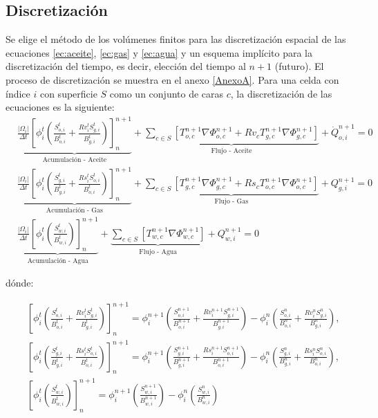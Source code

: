 \subsection{Discretización}

Se elige el método de los volúmenes finitos para las discretización espacial de las ecuaciones \ref{ec:aceite}, \ref{ec:gas} y \ref{ec:agua} y un esquema implícito para la discretización del tiempo, es decir, elección del tiempo al $n+1$ (futuro). El proceso de discretización se muestra en el anexo \ref{AnexoA}. Para una celda con índice $i$ con superficie $S$ como un conjunto de caras $c$, la discretización de las ecuaciones es la siguiente:
\begin{align}
\label{ec:aceiteDiscretizacion}&\underbrace{\frac{|\Omega_{i}|}{\Delta t}\left[ \phi^{t}_{i} \left( \frac{S_{o,i}^{t}}{B_{o,i}^{t}} + \frac{Rv_{i}^{t}S_{g,i}^{t}}{B_{g,i}^{t}}\right)\right]^{n+1}_{n}}_{\text{Acumulación - Aceite}} + 
\underbrace{\sum_{c \in S}\left[ T^{n+1}_{o,c} \nabla{\Phi_{o,c}^{n+1}} + Rv_{c}T^{n+1}_{g,c} \nabla{\Phi_{g,c}^{n+1}} \right] }_{\text{Flujo - Aceite}}+ \dot{Q}_{o,i}^{n+1} = 0 \\
\label{ec:gasDiscretizacion}&\underbrace{\frac{|\Omega_{i}|}{\Delta t}\left[ \phi^{t}_{i} \left( \frac{S_{g,i}^{t}}{B_{g,i}^{t}} + \frac{Rs_{i}^{t}S_{o,i}^{t}}{B_{o,i}^{t}}\right)\right]^{n+1}_{n}}_{\text{Acumulación - Gas}} + 
\underbrace{\sum_{c \in S}\left[ T^{n+1}_{g,c}\nabla{\Phi_{g,c}^{n+1} + Rs_{c}T^{n+1}_{o,c} \nabla{\Phi_{o,c}^{n+1}}} \right] }_{\text{Flujo - Gas}}+ Q_{g,i}^{n+1} = 0 \\
\label{ec:aguaDiscretizacion}&\underbrace{\frac{|\Omega_{i}|}{\Delta t}\left[ \phi^{t}_{i} \left( \frac{S_{w,i}^{t}}{B_{w,i}^{t}}\right)\right]^{n+1}_{n}}_{\text{Acumulación - Agua}}
+ 
\underbrace{\sum_{c \in S}\left[ T^{n+1}_{w,c}\nabla{\Phi_{w,c}^{n+1}} \right]}_{\text{Flujo - Agua}} + Q_{w,i}^{n+1} = 0 
\end{align}

dónde:

\begin{align*}
	&\left[ \phi^{t}_{i} \left( \frac{S_{o,i}^{t}}{B_{o,i}^{t}} + \frac{Rv_{i}^{t}S_{g,i}^{t}}{B_{g,i}^{t}}\right)\right]^{n+1}_{n} = 
	\phi^{n+1}_{i} \left( \frac{S_{o,i}^{n+1}}{B_{o,i}^{n+1}} + \frac{Rv_{i}^{n+1}S_{g,i}^{n+1}}{B_{g,i}^{n+1}}\right) - \phi^{n}_{i} \left( \frac{S_{o,i}^{n}}{B_{o,i}^{n}} + \frac{Rv_{i}^{n}S_{g,i}^{n}}{B_{g,i}^{n}}\right),\\
	&\left[ \phi^{t}_{i} \left( \frac{S_{g,i}^{t}}{B_{g,i}^{t}} + \frac{Rs_{i}^{t}S_{o,i}^{t}}{B_{o,i}^{t}}\right)\right]^{n+1}_{n} = 
	\phi^{n+1}_{i} \left( \frac{S_{g,i}^{n+1}}{B_{g,i}^{n+1}} + \frac{Rs_{i}^{n+1}S_{o,i}^{n+1}}{B_{o,i}^{n+1}}\right) - \phi^{n}_{i} \left( \frac{S_{g,i}^{n}}{B_{g,i}^{n}} + \frac{Rs_{i}^{n}S_{o,i}^{n}}{B_{o,i}^{n}}\right),\\
	&\left[ \phi^{t}_{i} \left( \frac{S_{w,i}^{t}}{B_{w,i}^{t}}\right)\right]^{n+1}_{n} = 
	\phi^{n+1}_{i} \left( \frac{S_{w,i}^{n+1}}{B_{w,i}^{n+1}}\right) - \phi^{n}_{i} \left( \frac{S_{w,i}^{n}}{B_{w,i}^{n}}\right)
\end{align*}


